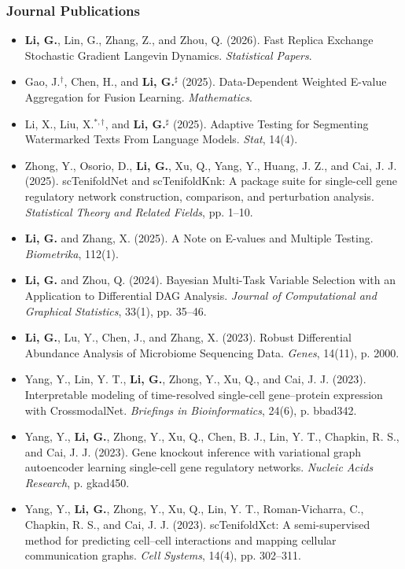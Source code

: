 \documentclass[letterpaper,11pt]{article}
\begin{document}
\subsubsection*{Journal Publications}
\begin{itemize}[leftmargin=0.15in, label={}]
    \item \textbf{Li, G.}, Lin, G., Zhang, Z., and Zhou, Q. (2026). Fast Replica Exchange Stochastic Gradient Langevin Dynamics. \textit{Statistical Papers}.
    \item Gao, J.$^\dagger$, Chen, H., and \textbf{Li, G.$^\sharp$} (2025). Data-Dependent Weighted E-value Aggregation for Fusion Learning. \textit{Mathematics}.
    \item Li, X., Liu, X.$^{*,\dagger}$, and \textbf{Li, G.$^\sharp$} (2025). Adaptive Testing for Segmenting Watermarked Texts From Language Models. \textit{Stat}, 14(4).
    \item Zhong, Y., Osorio, D., \textbf{Li, G.}, Xu, Q., Yang, Y., Huang, J. Z., and Cai, J. J. (2025). scTenifoldNet and scTenifoldKnk: A package suite for single-cell gene regulatory network construction, comparison, and perturbation analysis. \textit{Statistical Theory and Related Fields}, pp. 1--10.
    \item \textbf{Li, G.} and Zhang, X. (2025). A Note on E-values and Multiple Testing. \textit{Biometrika}, 112(1).
    \item \textbf{Li, G.} and Zhou, Q. (2024). Bayesian Multi-Task Variable Selection with an Application to Differential DAG Analysis. \textit{Journal of Computational and Graphical Statistics}, 33(1), pp. 35--46.
    \item \textbf{Li, G.}, Lu, Y., Chen, J., and Zhang, X. (2023). Robust Differential Abundance Analysis of Microbiome Sequencing Data. \textit{Genes}, 14(11), p. 2000.
    \item Yang, Y., Lin, Y. T., \textbf{Li, G.}, Zhong, Y., Xu, Q., and Cai, J. J. (2023). Interpretable modeling of time-resolved single-cell gene--protein expression with CrossmodalNet. \textit{Briefings in Bioinformatics}, 24(6), p. bbad342.
    \item Yang, Y., \textbf{Li, G.}, Zhong, Y., Xu, Q., Chen, B. J., Lin, Y. T., Chapkin, R. S., and Cai, J. J. (2023). Gene knockout inference with variational graph autoencoder learning single-cell gene regulatory networks. \textit{Nucleic Acids Research}, p. gkad450.
    \item Yang, Y., \textbf{Li, G.}, Zhong, Y., Xu, Q., Lin, Y. T., Roman-Vicharra, C., Chapkin, R. S., and Cai, J. J. (2023). scTenifoldXct: A semi-supervised method for predicting cell--cell interactions and mapping cellular communication graphs. \textit{Cell Systems}, 14(4), pp. 302--311.

\end{itemize}
\end{document}
